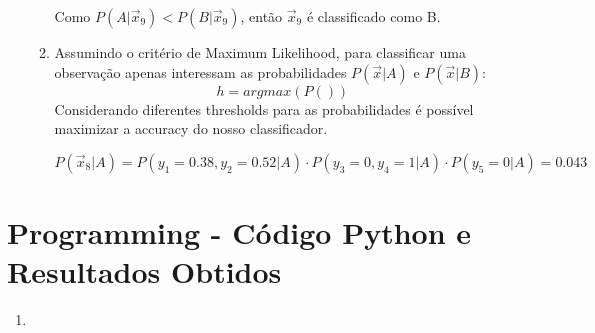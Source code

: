 \documentclass[a4paper,12pt]{article} %
\begin{document}
\begin{enumerate}
\begin{enumerate}
Como $P(A|\vec{x}_9) < P(B|\vec{x}_9)$, então $\vec{x}_9$ é classificado como B. 

\item 
Assumindo o critério de Maximum Likelihood, para classificar uma observação apenas interessam as probabilidades $P(\vec{x}|A)$ e $P(\vec{x}|B)$:
\begin{equation*}
    h = argmax(P())
\end{equation*}
Considerando diferentes thresholds para as probabilidades é possível maximizar a accuracy do nosso classificador.

\begin{equation*}
    P(\vec{x}_8|A) = P(y_1=0.38,y_2=0.52|A) \cdot P(y_3=0,y_4=1|A) \cdot P(y_5=0|A) = 0.043
\end{equation*}

\end{enumerate}





\end{enumerate}

\clearpage
\section*{Programming - Código Python e Resultados Obtidos}

\begin{enumerate}
    \item 
    
\end{enumerate}
\end{document}
